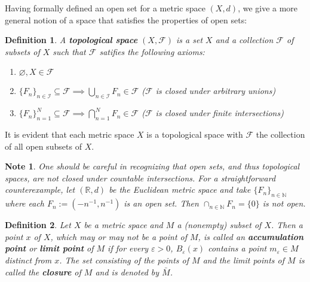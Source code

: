 \documentclass[11pt]{article}
\theoremstyle{mystyle}
\newtheorem{defn}{Definition}[section]
\newtheorem{note}{Note}[section]
\begin{document}
Having formally defined an open set for a metric space $(X, d)$, we give a more general notion of a space that satisfies the properties of open sets:
\begin{defn}
A \textbf{topological space} $(X, \mathscr{F})$ is a set $X$ and a collection $\mathscr{F}$ of subsets of $X$ such that $\mathscr{F}$ satifies the following axioms:
\begin{enumerate}
    \item $\varnothing, X \in \mathscr{F}$ 
    \item $\{F_n\}_{n \in \mathcal{I}} \subseteq \mathscr{F} \implies \bigcup_{n \in \mathcal{I}} F_n \in \mathscr{F}$ \quad ($\mathscr{F}$ is closed under arbitrary unions)
    \item $\{F_n\}_{n=1}^N \subseteq \mathscr{F} \implies \bigcap_{n=1}^N F_n \in \mathscr{F}$ \quad ($\mathscr{F}$ is closed under finite intersections)
\end{enumerate}
\end{defn}

It is evident that each metric space $X$ is a topological space with $\mathscr{F}$ the collection of all open subsets of $X$.

\begin{note}
One should be careful in recognizing that open sets, and thus topological spaces, \textit{are not closed under countable intersections}. For a straightforward counterexample, let $(\mathbb{R}, d)$ be the Euclidean metric space and take $\{F_n \}_{n \in \mathbb{N}}$ where each $F_n := (-n^{-1}, n^{-1})$ is an open set. Then $\cap_{n \in \mathbb{N}} F_n = \{ 0 \}$ is not open.
\end{note}

\begin{defn}
Let $X$ be a metric space and $M$ a (nonempty) subset of $X$. Then a point $x$ of $X$, which may or may not be a point of $M$, is called an \textbf{accumulation point} or \textbf{limit point} of $M$ if for every $\varepsilon > 0$, $B_{\varepsilon}(x)$ contains a point $m_{\varepsilon}\in M$ distinct from $x$. The set consisting of the points of $M$ and the limit points of $M$ is called the \textbf{closure} of $M$ and is denoted by $\bar{M}$.
\end{defn}
\end{document}
